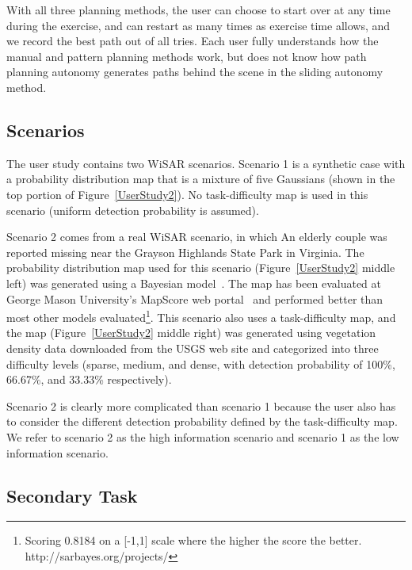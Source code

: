 With all three planning methods, the user can choose to start over at any time during the exercise, and can restart as many times as exercise time allows, and we record the best path out of all tries. Each user fully understands how the manual and pattern planning methods work, but does not know how path planning autonomy generates paths behind the scene in the sliding autonomy method.

\subsection{Scenarios}

The user study contains two WiSAR scenarios. Scenario 1 is a synthetic case with a probability distribution map that is a mixture of five Gaussians (shown in the top portion of Figure~\ref{UserStudy2}). No task-difficulty map is used in this scenario (uniform detection probability is assumed). 

Scenario 2 comes from a real WiSAR scenario, in which An elderly couple was reported missing near the Grayson Highlands State Park in Virginia. The probability distribution map used for this scenario (Figure~\ref{UserStudy2} middle left) was generated using a Bayesian model~\cite{Lin2010Bayesian}. The map has been evaluated at George Mason University's MapScore web portal~\cite{Twardy2012MapScore} and performed better than most other models evaluated\footnote{Scoring 0.8184 on a [-1,1] scale where the higher the score the better. http://sarbayes.org/projects/}. This scenario also uses a task-difficulty map, and the map (Figure~\ref{UserStudy2} middle right) was generated using vegetation density data downloaded from the USGS web site and categorized into three difficulty levels (sparse, medium, and dense, with detection probability of 100\%, 66.67\%, and 33.33\% respectively).

Scenario 2 is clearly more complicated than scenario 1 because the user also has to consider the different detection probability defined by the task-difficulty map. We refer to scenario 2 as the high information scenario and scenario 1 as the low information scenario.

\subsection{Secondary Task}


